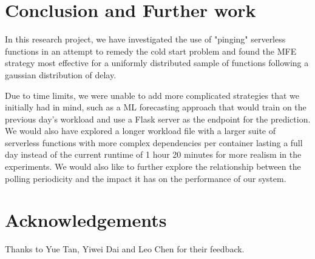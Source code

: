 \documentclass{article}
\begin{document}
\section{Conclusion and Further work}

In this research project, we have investigated the use of "pinging" serverless functions in an attempt to remedy the cold start problem and found the MFE strategy most effective for a uniformly distributed sample of functions following a gaussian distribution of delay.

Due to time limits, we were unable to add more complicated strategies that we initially had in mind, such as a ML forecasting approach that would train on the previous day's workload and use a Flask server as the endpoint for the prediction. We would also have explored a longer workload file with a larger suite of serverless functions with more complex dependencies per container lasting a full day instead of the current runtime of 1 hour 20 minutes for more realism in the experiments. We would also like to further explore the relationship between the polling periodicity and the impact it has on the performance of our system.

\section{Acknowledgements}

Thanks to Yue Tan, Yiwei Dai and Leo Chen for their feedback.



\end{document}
